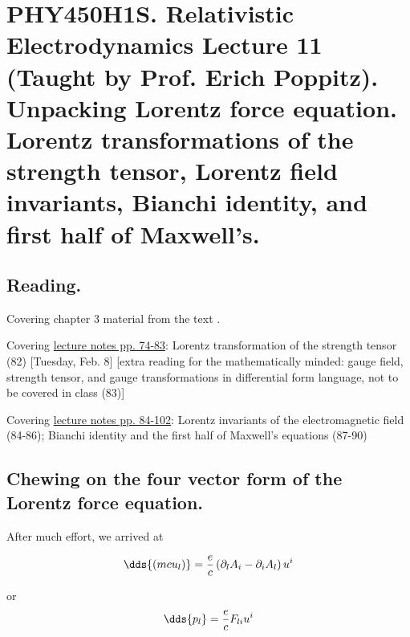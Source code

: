 
%

\chapter{PHY450H1S.  Relativistic Electrodynamics Lecture 11 (Taught by Prof. Erich Poppitz).  Unpacking Lorentz force equation.  Lorentz transformations of the strength tensor, Lorentz field invariants, Bianchi identity, and first half of Maxwell's.}
\label{chap:relativisticElectrodynamicsL11}
{}
\date{Feb 9, 2011}

\beginArtWithToc

\section{Reading.}

Covering chapter 3 material from the text \cite{landau1980classical}.

Covering \href{http://www.physics.utoronto.ca/~poppitz/e-poppitz/PHY450_files/RelEMpp74-83.pdf}{lecture notes pp. 74-83}: Lorentz transformation of the strength tensor (82) [Tuesday, Feb. 8] [extra reading for the mathematically minded: gauge field, strength tensor, and gauge transformations in differential form language, not to be covered in class (83)] 

Covering \href{http://www.physics.utoronto.ca/~poppitz/e-poppitz/PHY450_files/RelEMpp84-102.pdf}{lecture notes pp. 84-102}: Lorentz invariants of the electromagnetic field (84-86); Bianchi identity and the first half of Maxwell's equations (87-90)

\section{Chewing on the four vector form of the Lorentz force equation.}

After much effort, we arrived at 

\begin{equation}\label{eqn:relativisticElectrodynamicsL11:10}
\dds{(m c u_l) } = \frac{e}{c} \left( \partial_l A_i - \partial_i A_l \right) u^i
\end{equation}

or
\begin{equation}\label{eqn:relativisticElectrodynamicsL11:30}
\dds{ p_l } = \frac{e}{c} F_{l i} u^i
\end{equation}

